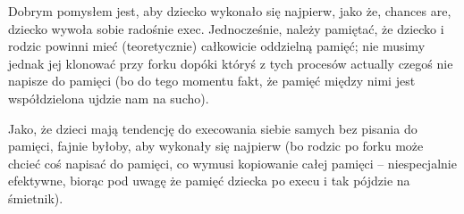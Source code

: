 Dobrym pomysłem jest, aby dziecko wykonało się najpierw, jako że, chances are, dziecko wywoła sobie radośnie exec. Jednocześnie, należy pamiętać, że dziecko i rodzic powinni mieć (teoretycznie) całkowicie oddzielną pamięć; nie musimy jednak jej klonować przy forku dopóki któryś z tych procesów actually czegoś nie napisze do pamięci (bo do tego momentu fakt, że pamięć między nimi jest współdzielona ujdzie nam na sucho).

Jako, że dzieci mają tendencję do execowania siebie samych bez pisania do pamięci, fajnie byłoby, aby wykonały się najpierw (bo rodzic po forku może chcieć coś napisać do pamięci, co wymusi kopiowanie całej pamięci -- niespecjalnie efektywne, biorąc pod uwagę że pamięć dziecka po execu i tak pójdzie na śmietnik).

